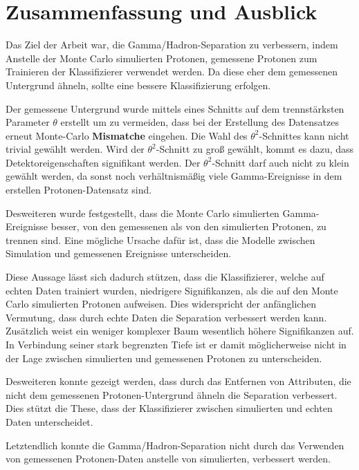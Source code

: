 \chapter{Zusammenfassung und Ausblick}
Das Ziel der Arbeit war, die Gamma/Hadron-Separation zu verbessern, indem Anstelle der Monte Carlo simulierten Protonen, gemessene Protonen zum Trainieren der Klassifizierer verwendet werden. 
Da diese eher dem gemessenen Untergrund ähneln, sollte eine bessere Klassifizierung erfolgen.

Der gemessene Untergrund wurde mittels eines Schnitts auf dem trennstärksten Parameter $\theta$ erstellt um zu vermeiden, dass bei der Erstellung des Datensatzes erneut Monte-Carlo \textbf{Mismatche} eingehen.
Die Wahl des $\theta^{2}$-Schnittes kann nicht trivial gewählt werden. 
Wird der $\theta^{2}$-Schnitt zu groß gewählt, kommt es dazu, dass Detektoreigenschaften signifikant werden. 
Der $\theta^{2}$-Schnitt darf auch nicht zu klein gewählt werden, da sonst noch verhältnismäßig viele Gamma-Ereignisse in dem erstellen Protonen-Datensatz sind.

Desweiteren wurde festgestellt, dass die Monte Carlo simulierten Gamma-Ereignisse besser, von den gemessenen als von den simulierten Protonen, zu trennen sind. 
Eine mögliche Ursache dafür ist, dass die Modelle zwischen Simulation und gemessenen Ereignisse unterscheiden.

Diese Aussage lässt sich dadurch stützen, dass die Klassifizierer, welche auf echten Daten trainiert wurden, niedrigere Signifikanzen, als die auf den Monte Carlo simulierten Protonen aufweisen. 
Dies widerspricht der anfänglichen Vermutung, dass durch echte Daten die Separation verbessert werden kann. 
Zusätzlich weist ein weniger komplexer Baum wesentlich höhere Signifikanzen auf. 
In Verbindung seiner stark begrenzten Tiefe ist er damit möglicherweise nicht in der Lage zwischen simulierten und gemessenen Protonen zu unterscheiden. 

Desweiteren konnte gezeigt werden, dass durch das Entfernen von Attributen, die nicht dem gemessenen Protonen-Untergrund ähneln die Separation verbessert. 
Dies stützt die These, dass der Klassifizierer zwischen simulierten und echten Daten unterscheidet.

Letztendlich konnte die Gamma/Hadron-Separation nicht durch das Verwenden von gemessenen Protonen-Daten anstelle von simulierten, verbessert werden. 
